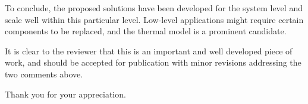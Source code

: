 \begin{authors}
To conclude, the proposed solutions have been developed for the system level
and scale well within this particular level. Low-level applications might
require certain components to be replaced, and the thermal model is a prominent
candidate.

\begin{actions}
\end{actions}
\end{authors}

\begin{reviewer}
It is clear to the reviewer that this is an important and well developed
piece of work, and should be accepted for publication with minor revisions
addressing the two comments above.
\end{reviewer}

\begin{authors}
  Thank you for your appreciation.
\end{authors}
